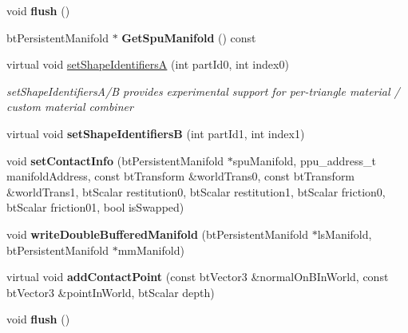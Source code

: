 \begin{DoxyCompactItemize}
void {\bfseries flush} ()
\item 
\mbox{\label{classSpuContactResult_aa80ee2d8a2ba0951128f11803423fec3}} 
bt\+Persistent\+Manifold $\ast$ {\bfseries Get\+Spu\+Manifold} () const
\item 
\mbox{\label{classSpuContactResult_a6f268869c21fe611720d68fec0259ece}} 
virtual void \hyperlink{classSpuContactResult_a6f268869c21fe611720d68fec0259ece}{set\+Shape\+IdentifiersA} (int part\+Id0, int index0)
\begin{DoxyCompactList}\small\item\em set\+Shape\+Identifiers\+A/B provides experimental support for per-\/triangle material / custom material combiner \end{DoxyCompactList}\item 
\mbox{\label{classSpuContactResult_a8eb3688eac7ace6e30b32e3614ec3d71}} 
virtual void {\bfseries set\+Shape\+IdentifiersB} (int part\+Id1, int index1)
\item 
\mbox{\label{classSpuContactResult_ad7f7b13a470a2ecc15dc220712c38c1c}} 
void {\bfseries set\+Contact\+Info} (bt\+Persistent\+Manifold $\ast$spu\+Manifold, ppu\+\_\+address\+\_\+t manifold\+Address, const bt\+Transform \&world\+Trans0, const bt\+Transform \&world\+Trans1, bt\+Scalar restitution0, bt\+Scalar restitution1, bt\+Scalar friction0, bt\+Scalar friction01, bool is\+Swapped)
\item 
\mbox{\label{classSpuContactResult_a4a8870acdf01594bed6377d450583a95}} 
void {\bfseries write\+Double\+Buffered\+Manifold} (bt\+Persistent\+Manifold $\ast$ls\+Manifold, bt\+Persistent\+Manifold $\ast$mm\+Manifold)
\item 
\mbox{\label{classSpuContactResult_af54e70a4441363bccf6351c56828f288}} 
virtual void {\bfseries add\+Contact\+Point} (const bt\+Vector3 \&normal\+On\+B\+In\+World, const bt\+Vector3 \&point\+In\+World, bt\+Scalar depth)
\item 
\mbox{\label{classSpuContactResult_a800bdacef835a99296beed51a39eb9b5}} 
void {\bfseries flush} ()
\end{DoxyCompactItemize}


